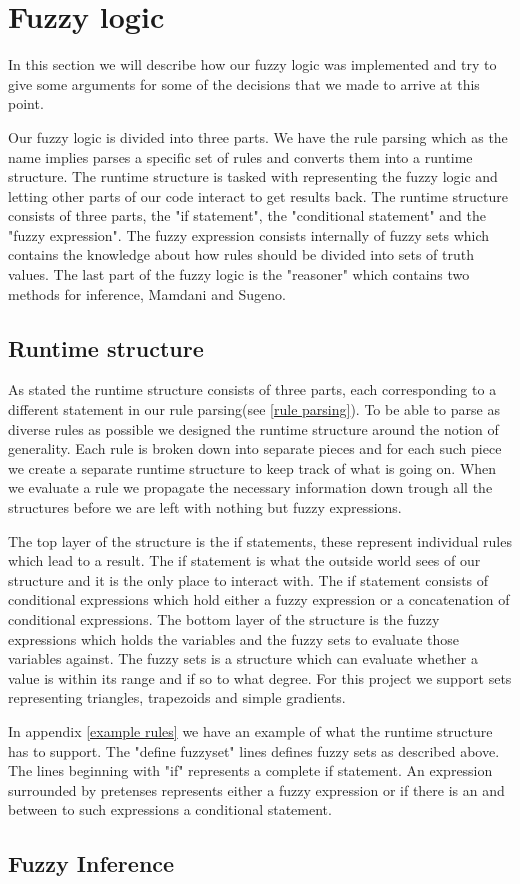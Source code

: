 \section{Fuzzy logic}\label{fuzzy logic}
In this section we will describe how our fuzzy logic was implemented and try to
give some arguments for some of the decisions that we made to arrive
at this point.

Our fuzzy logic is divided into three parts. We have the rule parsing which as
the name implies parses a specific set of rules and converts them into a runtime
structure. The runtime structure is tasked with representing the fuzzy logic and
letting other parts of our code interact to get results back. The runtime structure
consists of three parts, the "if statement", the "conditional statement" and
the "fuzzy expression". The fuzzy expression consists internally of fuzzy sets
which contains the knowledge about how rules should be divided into sets of truth
values. The last part of the fuzzy logic is the "reasoner" which contains two 
methods for inference, Mamdani and Sugeno.

\subsection{Runtime structure}\label{runtime structure}
As stated the runtime structure consists of three parts, each corresponding to
a different statement in our rule parsing(see \ref{rule parsing}). To be able
to parse as diverse rules as possible we designed the runtime structure around
the notion of generality. Each rule is broken down into separate pieces and for
each such piece we create a separate runtime structure to keep track of what
is going on. When we evaluate a rule we propagate the necessary information
down trough all the structures before we are left with nothing but fuzzy expressions.

The top layer of the structure is the if statements, these represent individual
rules which lead to a result. The if statement is what the outside world sees
of our structure and it is the only place to interact with. The if statement
consists of conditional expressions which hold either a fuzzy expression or
a concatenation of conditional expressions. The bottom layer of the structure
is the fuzzy expressions which holds the variables and the fuzzy sets to evaluate
those variables against. The fuzzy sets is a structure which can evaluate whether
a value is within its range and if so to what degree. For this project
we support sets representing triangles, trapezoids and simple gradients.

In appendix \ref{example rules} we have an example of what the runtime structure
has to support. The "define fuzzyset" lines defines fuzzy sets as described above.
The lines beginning with "if" represents a complete if statement. An expression
surrounded by pretenses represents either a fuzzy expression or if there is an
and between to such expressions a conditional statement.

\subsection{Fuzzy Inference}\label{fuzzy inference}

